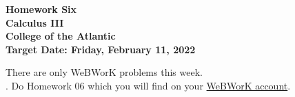 \documentclass[12pt]{article}
\begin{document}
\pagestyle{empty}
 
\begin{center}
{\LARGE {\bf Homework Six}}\\
\bigskip
{\Large {\bf Calculus III}}\\
\bigskip
{\Large {\bf College of the Atlantic}}\\
\bigskip
{ {\bf Target Date: Friday, February 11, 2022}}\\  
\end{center}
\medskip


\noindent There are only WeBWorK problems this week.\\

.  Do Homework 06 which you will find 
on your \href{https://webwork.runestone.academy/webwork2/coa-feldman-es3028m-winter-2022/}{WeBWorK account}.\\
\end{document}
